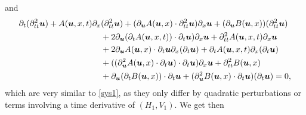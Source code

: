 \documentclass[11pt]{article}
\numberwithin{equation}{section}
\theoremstyle{definition}
\begin{document}
and
\begin{align}
\label{V3}
\partial_{t}(\partial_{tt}^{2}\boldsymbol{u})+A(\boldsymbol{u},x,t)\partial_{x}&(\partial_{tt}^{2}\boldsymbol{u})
+(\partial_{\boldsymbol{u}}A(\boldsymbol{u},x)\cdot\partial_{tt}^{2}\boldsymbol{u})\partial_{x}\boldsymbol{u}
+(\partial_{\boldsymbol{u}}B(\boldsymbol{u},x))(\partial_{tt}^{2}\boldsymbol{u})\\
\notag&+2\partial_{\boldsymbol{u}}(\partial_{t}A(\boldsymbol{u},x,t))\cdot\partial_{t}\boldsymbol{u})\partial_{x}\boldsymbol{u}+\partial_{tt}^{2}A(\boldsymbol{u},x,t)\partial_{x}\boldsymbol{u}\\
\notag&+2\partial_{\boldsymbol{u}}A(\boldsymbol{u},x)\cdot\partial_{t}\boldsymbol{u}\partial_{x}(\partial_{t}\boldsymbol{u})+\partial_{t}A(\boldsymbol{u},x,t)\partial_{x}(\partial_{t}\boldsymbol{u})\\
\notag&+((\partial^{2}_{\boldsymbol{u}}A(\boldsymbol{u},x)\cdot\partial_{t}\boldsymbol{u})\cdot\partial_{t}\boldsymbol{u})\partial_{x}\boldsymbol{u}+\partial_{tt}^{2}B(\boldsymbol{u},x)\\
\notag&+\partial_{\boldsymbol{u}}(\partial_{t}B(\boldsymbol{u},x))\cdot\partial_{t}\boldsymbol{u}
+(\partial^{2}_{\boldsymbol{u}}B(\boldsymbol{u},x)\cdot\partial_{t}\boldsymbol{u})(\partial_{t}\boldsymbol{u})=0,
\end{align}
which are very similar to \eqref{sys1}, as they only differ by quadratic perturbations or terms involving a time derivative of $(H_{1},V_{1})$.
We get then
\end{document}
